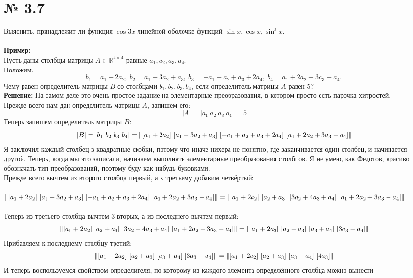 \documentclass[a4paper,11pt]{report}
\begin{document}
\section{№ 3.7}
Выяснить, принадлежит ли функция $\cos{3x}$ линейной оболочке функций $\sin{x}, \cos{x}, \sin^3{x}$.\\
\\
\textbf{Пример:}\\
Пусть даны столбцы матрицы $A \in \mathbb{R}^{4\times4}$ равные $a_1, a_2, a_3, a_4$.\\
Положим:
\[
b_1 = a_1 + 2a_2,\ 
b_2 = a_1 + 3a_2 + a_3,\ 
b_3 = -a_1 + a_2 + a_3 + 2a_4,\ 
b_4 = a_1 + 2a_2 + 3a_3 - a_4.\ 
\]
Чему равен определитель матрицы $B$ со столбцами $b_1, b_2, b_3, b_4$, если определитель матрицы $A$ равен 5?\\
\textbf{Решение:}
На самом деле это очень простое задание на элементарные преобразования, в котором просто есть парочка хитростей.\\
Прежде всего нам дан определитель матрицы $A$, запишем его:
\[
|A| = |a_1\ a_2\ a_3\ a_4| = 5
\]
Теперь запишем определитель матрицы $B$:
\[
|B| = |b_1\ b_2\ b_3\ b_4| = \Arrowvert[a_1 + 2a_2]\ [a_1 + 3a_2 + a_3]\ [-a_1 + a_2 + a_3 + 2a_4]\ [a_1 + 2a_2 + 3a_3 - a_4]\Arrowvert
\]
Я заключил каждый столбец в квадратные скобки, потому что иначе нихера не понятно, где заканчивается один столбец, и начинается
другой. Теперь, когда мы это записали, начинаем выполнять элементарные преобразования столбцов. Я не умею,
как Федотов, красиво обозначать тип преобразований, поэтому буду как-нибудь буковками.\\
Прежде всего вычтем из второго столбца первый, а к третьему добавим четвёртый:
\\\\
$
\Arrowvert[a_1 + 2a_2]\ [a_1 + 3a_2 + a_3]\ [-a_1 + a_2 + a_3 + 2a_4]\ [a_1 + 2a_2 + 3a_3 - a_4]\Arrowvert =\\
\Arrowvert[a_1 + 2a_2]\ [a_2 + a_3]\ [3a_2 + 4a_3 + a_4]\ [a_1 + 2a_2 + 3a_3 - a_4]\Arrowvert
$
\\\\
Теперь из третьего столбца вычтем 3 вторых, а из последнего вычтем первый:
\[
\Arrowvert[a_1 + 2a_2]\ [a_2 + a_3]\ [3a_2 + 4a_3 + a_4]\ [a_1 + 2a_2 + 3a_3 - a_4]\Arrowvert =
\Arrowvert[a_1 + 2a_2]\ [a_2 + a_3]\ [a_3 + a_4]\ [3a_3 - a_4]\Arrowvert
\]
Прибавляем к последнему столбцу третий:
\[
\Arrowvert[a_1 + 2a_2]\ [a_2 + a_3]\ [a_3 + a_4]\ [3a_3 - a_4]\Arrowvert =
\Arrowvert[a_1 + 2a_2]\ [a_2 + a_3]\ [a_3 + a_4]\ [4a_3]\Arrowvert
\]
И теперь воспользуемся свойством определителя, по которому из каждого элемента определённого столбца можно вынести
\end{document}
